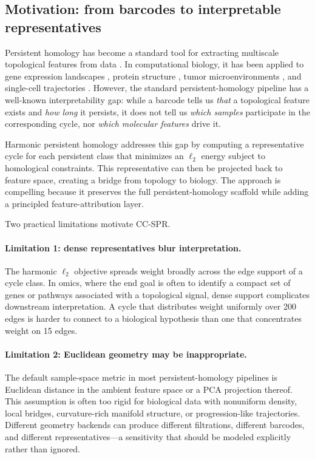 \documentclass[11pt]{article}
\begin{document}
\subsection{Motivation: from barcodes to interpretable representatives}

Persistent homology has become a standard tool for extracting multiscale topological features from data \cite{edelsbrunner2010,carlsson2009}.
In computational biology, it has been applied to gene expression landscapes \cite{rizvi2017}, protein structure \cite{xia2014}, tumor microenvironments \cite{vipond2021}, and single-cell trajectories \cite{moon2019phate}.
However, the standard persistent-homology pipeline has a well-known interpretability gap: while a barcode tells us \emph{that} a topological feature exists and \emph{how long} it persists, it does not tell us \emph{which samples} participate in the corresponding cycle, nor \emph{which molecular features} drive it.

Harmonic persistent homology \cite{harmonicPH} addresses this gap by computing a representative cycle for each persistent class that minimizes an $\ell_2$ energy subject to homological constraints.
This representative can then be projected back to feature space, creating a bridge from topology to biology.
The approach is compelling because it preserves the full persistent-homology scaffold while adding a principled feature-attribution layer.

Two practical limitations motivate CC-SPR.

\paragraph{Limitation 1: dense representatives blur interpretation.}
The harmonic $\ell_2$ objective spreads weight broadly across the edge support of a cycle class.
In omics, where the end goal is often to identify a compact set of genes or pathways associated with a topological signal, dense support complicates downstream interpretation.
A cycle that distributes weight uniformly over 200 edges is harder to connect to a biological hypothesis than one that concentrates weight on 15 edges.

\paragraph{Limitation 2: Euclidean geometry may be inappropriate.}
The default sample-space metric in most persistent-homology pipelines is Euclidean distance in the ambient feature space or a PCA projection thereof.
This assumption is often too rigid for biological data with nonuniform density, local bridges, curvature-rich manifold structure, or progression-like trajectories.
Different geometry backends can produce different filtrations, different barcodes, and different representatives---a sensitivity that should be modeled explicitly rather than ignored.
\end{document}
